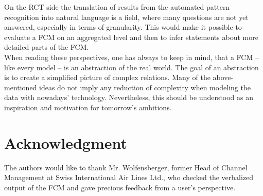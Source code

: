 \documentclass[conference]{IEEEtran}
\begin{document}
On the RCT side the translation of results from the automated pattern recognition into natural language is a field, where many questions are not yet answered, especially in terms of granularity. This would make it possible to evaluate a FCM on an aggregated level and then to infer statements about more detailed parts of the FCM.\\
When reading these perspectives, one has always to keep in mind, that a FCM -- like every model -- is an abstraction of the real world. The goal of an abstraction is to create a simplified picture of complex relations. Many of the above-mentioned ideas do not imply any reduction of complexity when modeling the data with nowadays' technology. Nevertheless, this should be understood as an inspiration and motivation for tomorrow's ambitions.

\section*{Acknowledgment}
The authors would like to thank Mr. Wolfensberger, former Head of Channel Management at Swiss International Air Lines Ltd., who checked the verbalized output of the FCM and gave precious feedback from a user's perspective.



\end{document}
